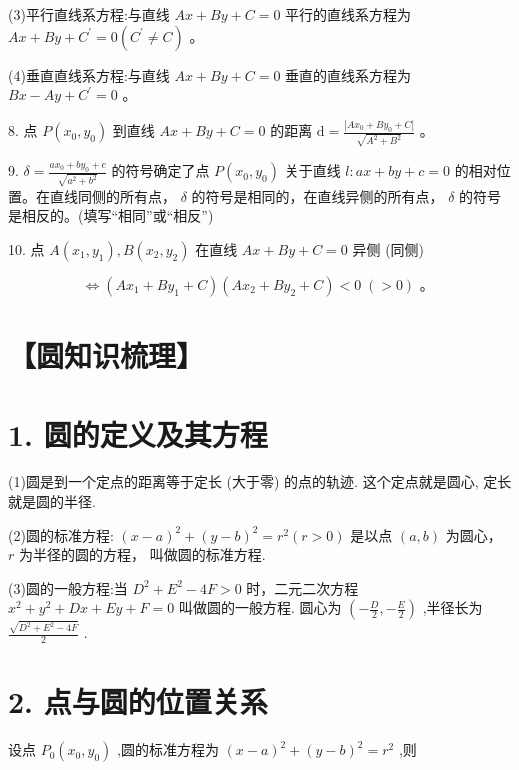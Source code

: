 \documentclass[10pt]{article}
\begin{document}
(3)平行直线系方程:与直线 \({Ax} + {By} + C = 0\) 平行的直线系方程为 \({Ax} + {By} + {C}^{\prime } = 0\left( {{C}^{\prime } \neq  C}\right)\) 。

(4)垂直直线系方程:与直线 \({Ax} + {By} + C = 0\) 垂直的直线系方程为 \({Bx} - {Ay} + {C}^{\prime } = 0\) 。

8. 点 \(P\left( {{x}_{0},{y}_{0}}\right)\) 到直线 \({Ax} + {By} + C = 0\) 的距离 \(\mathrm{d} = \frac{\left| A{x}_{0} + B{y}_{0} + C\right| }{\sqrt{{A}^{2} + {B}^{2}}}\) 。

9. \(\delta  = \frac{a{x}_{0} + b{y}_{0} + c}{\sqrt{{a}^{2} + {b}^{2}}}\) 的符号确定了点 \(P\left( {{x}_{0},{y}_{0}}\right)\) 关于直线 \(l : {ax} + {by} + c = 0\) 的相对位置。在直线同侧的所有点， \(\delta\) 的符号是相同的，在直线异侧的所有点， \(\delta\) 的符号是相反的。(填写“相同”或“相反”)

10. 点 \(A\left( {{x}_{1},{y}_{1}}\right) ,B\left( {{x}_{2},{y}_{2}}\right)\) 在直线 \({Ax} + {By} + C = 0\) 异侧 (同侧)

\[
\Leftrightarrow  \left( {A{x}_{1} + B{y}_{1} + C}\right) \left( {A{x}_{2} + B{y}_{2} + C}\right)  < 0\;\left( { > 0}\right) \text{ 。 }
\]

\section*{【圆知识梳理】}

\section*{1. 圆的定义及其方程}

(1)圆是到一个定点的距离等于定长 (大于零) 的点的轨迹. 这个定点就是圆心, 定长就是圆的半径.

(2)圆的标准方程: \({\left( x - a\right) }^{2} + {\left( y - b\right) }^{2} = {r}^{2}\left( {r > 0}\right)\) 是以点 \(\left( {a,b}\right)\) 为圆心， \(r\) 为半径的圆的方程， 叫做圆的标准方程.

(3)圆的一般方程:当 \({D}^{2} + {E}^{2} - {4F} > 0\) 时，二元二次方程 \({x}^{2} + {y}^{2} + {Dx} + {Ey} + F = 0\) 叫做圆的一般方程. 圆心为 \(\left( {-\frac{D}{2}, - \frac{E}{2}}\right)\) ,半径长为 \(\frac{\sqrt{{D}^{2} + {E}^{2} - {4F}}}{2}\) .

\section*{2. 点与圆的位置关系}

设点 \({P}_{0}\left( {{x}_{0},{y}_{0}}\right)\) ,圆的标准方程为 \({\left( x - a\right) }^{2} + {\left( y - b\right) }^{2} = {r}^{2}\) ,则
\end{document}
